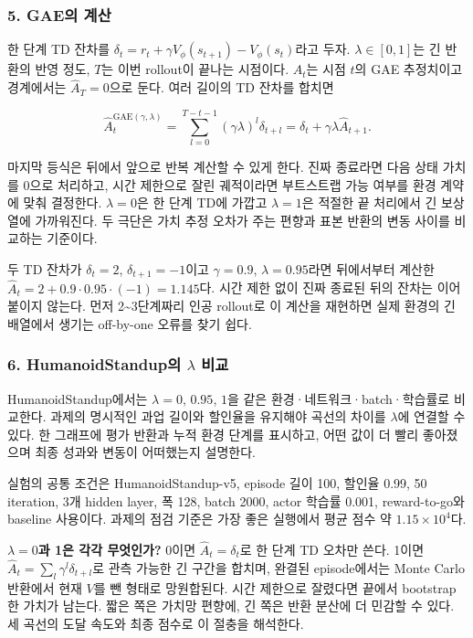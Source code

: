 \documentclass[11pt,a4paper]{article}
\begin{document}
\subsubsection{5. GAE의 계산}

한 단계 TD 잔차를 $\delta_t=r_t+\gamma V_\phi(s_{t+1})-V_\phi(s_t)$라고 두자. $\lambda\in[0,1]$는 긴 반환의 반영 정도, $T$는 이번 rollout이 끝나는 시점이다. $\widehat A_t$는 시점 $t$의 GAE 추정치이고 경계에서는 $\widehat A_T=0$으로 둔다. 여러 길이의 TD 잔차를 합치면\par

\[
\widehat A_t^{\mathrm{GAE}(\gamma,\lambda)}
=\sum_{l=0}^{T-t-1}(\gamma\lambda)^l\delta_{t+l}
=\delta_t+\gamma\lambda\widehat A_{t+1}.
\]

마지막 등식은 뒤에서 앞으로 반복 계산할 수 있게 한다. 진짜 종료라면 다음 상태 가치를 0으로 처리하고, 시간 제한으로 잘린 궤적이라면 부트스트랩 가능 여부를 환경 계약에 맞춰 결정한다. $\lambda=0$은 한 단계 TD에 가깝고 $\lambda=1$은 적절한 끝 처리에서 긴 보상열에 가까워진다. 두 극단은 가치 추정 오차가 주는 편향과 표본 반환의 변동 사이를 비교하는 기준이다.\par

두 TD 잔차가 $\delta_t=2$, $\delta_{t+1}=-1$이고 $\gamma=0.9$, $\lambda=0.95$라면 뒤에서부터 계산한 $\widehat A_t=2+0.9\cdot0.95\cdot(-1)=1.145$다. 시간 제한 없이 진짜 종료된 뒤의 잔차는 이어 붙이지 않는다. 먼저 2\~{}3단계짜리 인공 rollout로 이 계산을 재현하면 실제 환경의 긴 배열에서 생기는 off-by-one 오류를 찾기 쉽다.\par

\subsubsection{6. HumanoidStandup의 $\lambda$ 비교}

HumanoidStandup에서는 $\lambda=0$, $0.95$, $1$을 같은 환경·네트워크·batch·학습률로 비교한다. 과제의 명시적인 과업 길이와 할인율을 유지해야 곡선의 차이를 $\lambda$에 연결할 수 있다. 한 그래프에 평가 반환과 누적 환경 단계를 표시하고, 어떤 값이 더 빨리 좋아졌으며 최종 성과와 변동이 어떠했는지 설명한다.\par

실험의 공통 조건은 HumanoidStandup-v5, episode 길이 100, 할인율 0.99, 50 iteration, 3개 hidden layer, 폭 128, batch 2000, actor 학습률 0.001, reward-to-go와 baseline 사용이다. 과제의 점검 기준은 가장 좋은 실행에서 평균 점수 약 $1.15\times10^4$다.\par

\textbf{$\lambda=0$과 1은 각각 무엇인가?} 0이면 $\hat A_t=\delta_t$로 한 단계 TD 오차만 쓴다. 1이면 $\hat A_t=\sum_l\gamma^l\delta_{t+l}$로 관측 가능한 긴 구간을 합치며, 완결된 episode에서는 Monte Carlo 반환에서 현재 $V$를 뺀 형태로 망원합된다. 시간 제한으로 잘렸다면 끝에서 bootstrap한 가치가 남는다. 짧은 쪽은 가치망 편향에, 긴 쪽은 반환 분산에 더 민감할 수 있다. 세 곡선의 도달 속도와 최종 점수로 이 절충을 해석한다.\par
\end{document}
